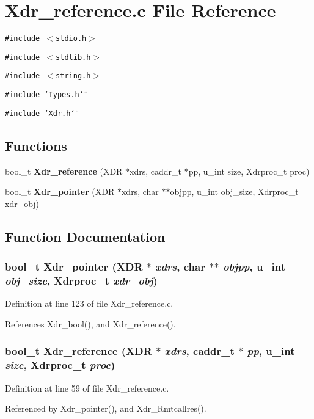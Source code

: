 \section{Xdr\_\-reference.c File Reference}
\label{Xdr__reference_8c}
{\tt \#include $<$stdio.h$>$}\par
{\tt \#include $<$stdlib.h$>$}\par
{\tt \#include $<$string.h$>$}\par
{\tt \#include \char`\"{}Types.h\char`\"{}}\par
{\tt \#include \char`\"{}Xdr.h\char`\"{}}\par
\subsection*{Functions}
\begin{CompactItemize}
\item 
bool\_\-t {\bf Xdr\_\-reference} (XDR $\ast$xdrs, caddr\_\-t $\ast$pp, u\_\-int size, Xdrproc\_\-t proc)
\item 
bool\_\-t {\bf Xdr\_\-pointer} (XDR $\ast$xdrs, char $\ast$$\ast$objpp, u\_\-int obj\_\-size, Xdrproc\_\-t xdr\_\-obj)
\end{CompactItemize}


\subsection{Function Documentation}
\subsubsection{\setlength{\rightskip}{0pt plus 5cm}bool\_\-t Xdr\_\-pointer (XDR $\ast$ {\em xdrs}, char $\ast$$\ast$ {\em objpp}, u\_\-int {\em obj\_\-size}, Xdrproc\_\-t {\em xdr\_\-obj})}\label{Xdr__reference_8c_a1}




Definition at line 123 of file Xdr\_\-reference.c.

References Xdr\_\-bool(), and Xdr\_\-reference().
\subsubsection{\setlength{\rightskip}{0pt plus 5cm}bool\_\-t Xdr\_\-reference (XDR $\ast$ {\em xdrs}, caddr\_\-t $\ast$ {\em pp}, u\_\-int {\em size}, Xdrproc\_\-t {\em proc})}\label{Xdr__reference_8c_a0}




Definition at line 59 of file Xdr\_\-reference.c.

Referenced by Xdr\_\-pointer(), and Xdr\_\-Rmtcallres().